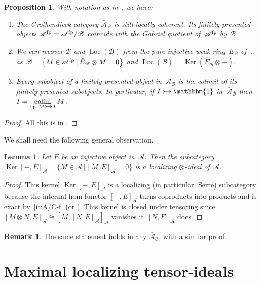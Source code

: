 \documentclass[JEP,XML,SOM,Unicode]{cedram}
\makeatletter
\newenvironment{enumeratea}
{\bgroup\def\theenumi{\alph{enumi}}\begin{enumerate}}
{\end{enumerate}\egroup}
\newcommand{\into}{\mathchoice{\xymatrix@=.5cm{\ar@{>->}[r]&}}
{\xymatrix@=.3cm{\ar@{>->}[r]&}\hspace*{-1mm}}
{\hspace*{-1mm}\xymatrix@=.25cm{\ar@{>->}[r]&}\hspace*{-1.5mm}}
{\xymatrix@=.1cm{\ar@{>->}[r]&}\hspace*{-1mm}}
}
\numberwithin{equation}{section}
\newtheorem{Prop}[equation]{Proposition}
\newtheorem{Lem}[equation]{Lemma}
\theoremstyle{definition}
\newtheorem{Rem}[equation]{Remark}
\DeclareMathOperator{\colim}{colim}
\DeclareMathOperator{\Ker}{Ker}
\newcommand{\cat}[1]{\mathscr{#1}}
\newcommand{\SET}[2]{\big\{#1\,\big|\,#2\big\}}
\newcommand{\unit}{\mathbbm{1}}
\DeclareMathOperator{\Loc}{Loc}
\newcommand{\AB}{\bar{\cA}_{\cB}}
\newcommand{\AC}{\bar{\cA}_{\cC}}
\newcommand{\bat}[1]{\bar{\cat{#1}}}
\newcommand{\cA}{\cat{A}}
\newcommand{\cB}{\cat{B}}
\newcommand{\cC}{\cat{C}}
\newcommand{\fp}{^{\textup{fp}}}
\newcommand{\hEB}{\hat E_{\cB}}
\makeatother
\begin{document}
\begin{Prop}
\label{Prop:A/B}
With notation as in~, we have:
\begin{enumeratea}
\item
\label{it:A/B-a}
The Grothendieck category $\AB$ is still locally coherent. Its finitely presented objects $\bat{A}{}\fp=\cA\fp/\cB$ coincide with the Gabriel quotient of~$\cA\fp$ by~$\cB$.

\item
\label{it:A/B-b}
We can recover $\cB$ and $\Loc(\cB)$ from the pure-injective weak ring~$E_\cB$ of~, as $\cB=\SET{M\in\cA\fp}{\hEB\otimes M=0}$ and $\Loc(\cB)=\Ker(\hEB\otimes-)$.

\item
\label{it:A/B-c}
Every subobject of a finitely presented object in~$\AB$ is the colimit of its finitely presented subobjects. In particular, if $I\into \bar\unit$ in~$\AB$ then $I=\mathop{\colim}\limits_{\textrm{f.p.\,}M\into I}M$.
\end{enumeratea}
\end{Prop}

\begin{proof}
All this is in \cite[\S3]{BalmerKrauseStevenson19}.
\end{proof}

We shall need the following general observation.

\begin{Lem}
\label{Lem:Ker[-,E]}
Let $E$ be an injective object in~$\cA$. Then the subcategory $\Ker [-,E]_{\cA}=\SET{M\in\cA}{[M,E]_{\cA}=0}$ is a localizing $\otimes$-ideal of~$\cA$.
\end{Lem}

\begin{proof}
This kernel $\Ker[-,E]_{\cA}$ is a localizing (in particular, Serre) subcategory because the internal-hom functor $[-,E]_{\cA}$ turns coproducts into products and is exact by \,\eqref{it:A/C-f} (or \cite[Lem.\,2.8]{BalmerKrauseStevenson19}). This kernel is closed under tensoring since $[M\otimes N,E]_{\cA}\cong [M,[N,E]_{\cA}]_{\cA}$ vanishes if~$[N,E]_{\cA}$ does.
\end{proof}

\begin{Rem}
The same statement holds in any $\AC$, with a similar proof.
\end{Rem}

\section{Maximal localizing tensor-ideals}
\label{sec:maximal}
\end{document}
